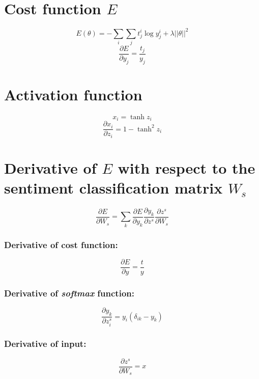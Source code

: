 \documentclass{article}
\begin{document}
\section*{Cost function $E$}
	\begin{equation}
		E(\theta) = - \sum\limits_{i}\sum\limits_{j}{t_{j}^{i} \log{y_{j}^{i}} + \lambda||\theta||^2}
	\end{equation}
	\begin{equation}
		\frac{\partial E}{\partial y_j} = \frac{t_j}{y_j}
	\end{equation}

\section*{Activation function}
	\begin{equation}
		x_i = \tanh{z_i}
	\end{equation}
	\begin{equation}
		\frac{\partial x_i}{\partial z_i} = 1 - \tanh^2{z_i}
	\end{equation}

\section*{Derivative of $E$ with respect to the sentiment classification matrix $W_s$}

	\begin{equation}
		\frac{\partial E}{\partial W_s} = 
		\sum\limits_{k}\frac{\partial E}{\partial y_k}{\frac{\partial y_k}{\partial z^{s}}}{\frac{\partial z^{s}}{\partial W_{s}}}
	\end{equation}
	\subsubsection*{Derivative of cost function:}
		\begin{equation}
			\frac{\partial E}{\partial y} = \frac{t}{y}
		\end{equation}
	\subsubsection*{Derivative of \emph{softmax} function:}
		\begin{equation}
			\frac{\partial y_k}{\partial z^{s}_{i}} = y_{i}(\delta_{ik} - y_{k})
		\end{equation}
	\subsubsection*{Derivative of input:}
		\begin{equation}
			\frac{\partial z^{s}}{\partial W_s} = x
		\end{equation}
\end{document}
